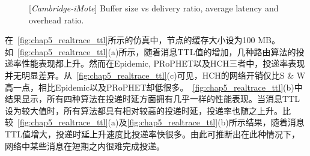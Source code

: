 \begin{figure}[tbp]
\centering
{}
\caption{[\emph{Cambridge-iMote}] Buffer size vs delivery ratio, average latency and overhead ratio.}
\label{fig:chap5_trace_buffer}
\end{figure}

在\figurename~\ref{fig:chap5_realtrace_ttl}所示的仿真中，节点的缓存大小设为100 MB。如\figurename~\ref{fig:chap5_realtrace_ttl}(a)所示，随着消息TTL值的增加，几种路由算法的投递率性能表现都上升。然而在Epidemic, PRoPHET以及HCH三者中，投递率表现并无明显差异。从\figurename~\ref{fig:chap5_realtrace_ttl}(c)可见，HCH的网络开销仅比S \& W高一点，相比Epidemic以及PRoPHET却低很多。\figurename~\ref{fig:chap5_realtrace_ttl}(b)中结果显示，所有四种算法在投递时延方面拥有几乎一样的性能表现。当消息TTL设为较大值时，所有算法都具有相对较高的投递时延，投递率也随之上升。比较\figurename~\ref{fig:chap5_realtrace_ttl}(a)及\ref{fig:chap5_realtrace_ttl}(b)所示结果，随着消息TTL值增大，投递时延上升速度比投递率快很多。由此可推断出在此种情况下，网络中某些消息在短期之内很难完成投递。


